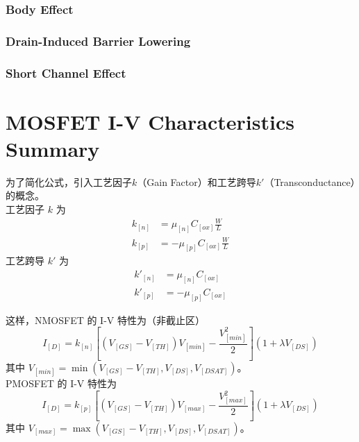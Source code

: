 \subsubsection{Body Effect}

\subsubsection{Drain-Induced Barrier Lowering}

\subsubsection{Short Channel Effect}

\section{MOSFET I-V Characteristics Summary}

为了简化公式，引入工艺因子$k$（Gain Factor）和工艺跨导$k'$（Transconductance）的概念。\\
工艺因子 $k$ 为
\begin{equation}
    \begin{aligned}
        k_[n] &= \mu_[n] C_[ox] \frac{W}{L} \\
        k_[p] &= -\mu_[p] C_[ox] \frac{W}{L}
    \end{aligned}
\end{equation}
工艺跨导 $k'$ 为
\begin{equation}
    \begin{aligned}
        k'_[n] &= \mu_[n] C_[ox] \\
        k'_[p] &= -\mu_[p] C_[ox]
    \end{aligned}
\end{equation}

这样，NMOSFET 的 I-V 特性为（非截止区）
\begin{equation}
    I_[D] = k_[n] \left[ (V_[GS] - V_[TH]) V_[min] - \frac{V_[min]^2}{2} \right] \left(1 + \lambda V_[DS]\right)
\end{equation}
其中 $V_[min] = \min \left(V_[GS] - V_[TH], V_[DS], V_[DSAT]\right)$。\\
PMOSFET 的 I-V 特性为
\begin{equation}
    I_[D] = k_[p] \left[ (V_[GS] - V_[TH]) V_[max] - \frac{V_[max]^2}{2} \right] \left(1 + \lambda V_[DS]\right)
\end{equation}
其中 $V_[max] = \max \left(V_[GS] - V_[TH], V_[DS], V_[DSAT]\right)$。

